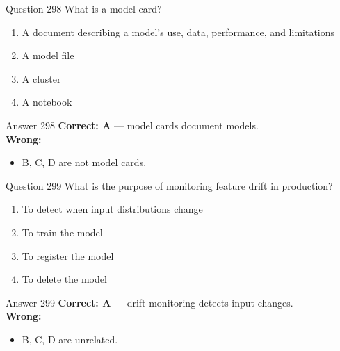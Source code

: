 \documentclass[aspectratio=169,11pt]{beamer}
\begin{document}
	\begin{frame}{Question 298}
		What is a model card?
		\begin{enumerate}[label=\Alph*.]
			\item A document describing a model's use, data, performance, and limitations
			\item A model file
			\item A cluster
			\item A notebook
		\end{enumerate}
	\end{frame}
	\begin{frame}{Answer 298}
		\textbf{Correct: A} --- model cards document models.\\
		\vspace{0.5em}
		\textbf{Wrong:}
		\begin{itemize}
			\item B, C, D are not model cards.
		\end{itemize}
	\end{frame}
	
	\begin{frame}{Question 299}
		What is the purpose of monitoring feature drift in production?
		\begin{enumerate}[label=\Alph*.]
			\item To detect when input distributions change
			\item To train the model
			\item To register the model
			\item To delete the model
		\end{enumerate}
	\end{frame}
	\begin{frame}{Answer 299}
		\textbf{Correct: A} --- drift monitoring detects input changes.\\
		\vspace{0.5em}
		\textbf{Wrong:}
		\begin{itemize}
			\item B, C, D are unrelated.
		\end{itemize}
	\end{frame}
	
\end{document}
